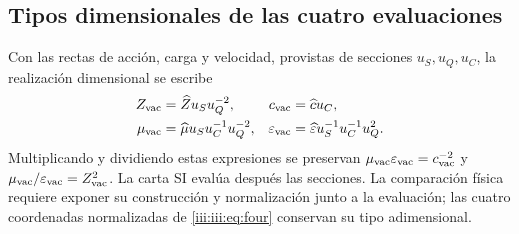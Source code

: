 \subsection{Tipos dimensionales de las cuatro evaluaciones}

Con las rectas de acción, carga y velocidad, provistas de secciones
$u_S,u_Q,u_C$, la realización dimensional se escribe
\begin{align}
 Z_{\rm vac}&=\widehat Z u_Su_Q^{-2},&
 c_{\rm vac}&=\widehat c u_C,\\
 \mu_{\rm vac}&=\widehat\mu u_Su_C^{-1}u_Q^{-2},&
 \varepsilon_{\rm vac}&=\widehat\varepsilon u_S^{-1}u_C^{-1}u_Q^2.
 \label{iii:iii:eq:dimensions}
\end{align}
Multiplicando y dividiendo estas expresiones se preservan
$\mu_{\rm vac}\varepsilon_{\rm vac}=c_{\rm vac}^{-2}$ y
$\mu_{\rm vac}/\varepsilon_{\rm vac}=Z_{\rm vac}^2$.
La carta SI evalúa después las secciones. La comparación física requiere
exponer su construcción y normalización junto a la evaluación; las cuatro
coordenadas normalizadas de \eqref{iii:iii:eq:four} conservan su tipo adimensional.
